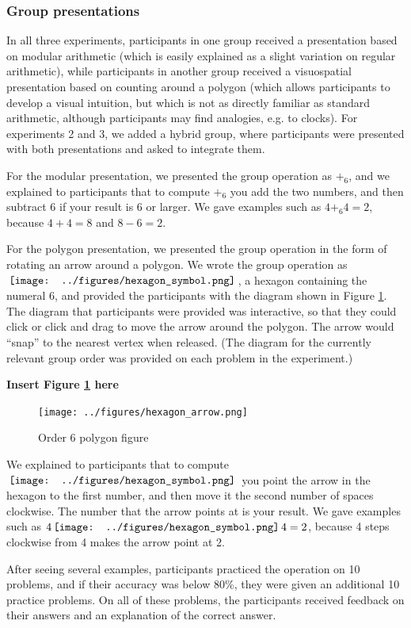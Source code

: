 \documentclass[man,10pt]{apa6}
\newcommand{\hex}{\,\vcenter{\hbox{\texttt{[image: ../figures/hexagon\_symbol.png]}}}\,}
\begin{document}
\subsubsection{Group presentations}
In all three experiments, participants in one group received a presentation based on modular arithmetic (which is easily explained as a slight variation on regular arithmetic), while participants in another group received a visuospatial presentation based on counting around a polygon (which allows participants to develop a visual intuition, but which is not as directly familiar as standard arithmetic, although participants may find analogies, e.g. to clocks). For experiments 2 and 3, we added a hybrid group, where participants were presented with both presentations and asked to integrate them. \par 
For the modular presentation, we presented the group operation as $+_6$, and we explained to participants that to compute $+_6$ you add the two numbers, and then subtract $6$ if your result is $6$ or larger. We gave examples such as $4 +_6 4 = 2$, because $4+4 = 8$ and $8-6=2$.\par
For the polygon presentation, we presented the group operation in the form of rotating an arrow around a polygon. We wrote the group operation as $\hex$, a hexagon containing the numeral $6$, and provided the participants with the diagram shown in Figure \ref{hexagonex}. The diagram that participants were provided was interactive, so that they could click or click and drag to move the arrow around the polygon. The arrow would ``snap'' to the nearest vertex when released. (The diagram for the currently relevant group order was provided on each problem in the experiment.)
\begin{center} 
{\bf Insert Figure \ref{hexagonex} here} 
\end{center}
\begin{figure} \centering \texttt{[image: ../figures/hexagon\_arrow.png]} \caption{Order 6 polygon figure} \label{hexagonex} 
\end{figure} 
\noindent
We explained to participants that to compute $\hex$ you point the arrow in the hexagon to the first number, and then move it the second number of spaces clockwise. The number that the arrow points at is your result. We gave examples such as $4 \hex 4 = 2$, because 4 steps clockwise from 4 makes the arrow point at 2. \par
After seeing several examples, participants practiced the operation on 10 problems, and if their accuracy was below 80\%, they were given an additional 10 practice problems. On all of these problems, the participants received feedback on their answers and an explanation of the correct answer. \par 
\end{document}
